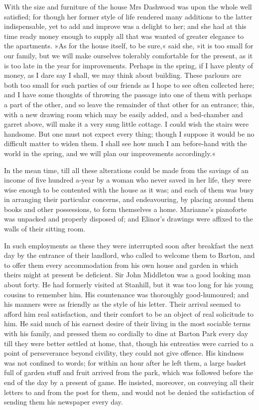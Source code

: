 With the size and furniture of the house Mrs Dashwood was upon the whole well satisfied; for though her former style of life rendered many additions to the latter indispensable, yet to add and improve was a delight to her; and she had at this time ready money enough to supply all that was wanted of greater elegance to the apartments. »As for the house itself, to be sure,« said she, »it is too small for our family, but we will make ourselves tolerably comfortable for the present, as it is too late in the year for improvements. Perhaps in the spring, if I have plenty of money, as I dare say I shall, we may think about building. These parlours are both too small for such parties of our friends as I hope to see often collected here; and I have some thoughts of throwing the passage into one of them with perhaps a part of the other, and so leave the remainder of that other for an entrance; this, with a new drawing room which may be easily added, and a bed-chamber and garret above, will make it a very snug little cottage. I could wish the stairs were handsome. But one must not expect every thing; though I suppose it would be no difficult matter to widen them. I shall see how much I am before-hand with the world in the spring, and we will plan our improvements accordingly.«

In the mean time, till all these alterations could be made from the savings of an income of five hundred a-year by a woman who never saved in her life, they were wise enough to be contented with the house as it was; and each of them was busy in arranging their particular concerns, and endeavouring, by placing around them books and other possessions, to form themselves a home. Marianne’s pianoforte was unpacked and properly disposed of; and Elinor’s drawings were affixed to the walls of their sitting room.

In such employments as these they were interrupted soon after breakfast the next day by the entrance of their landlord, who called to welcome them to Barton, and to offer them every accommodation from his own house and garden in which theirs might at present be deficient. Sir John Middleton was a good looking man about forty. He had formerly visited at Stanhill, but it was too long for his young cousins to remember him. His countenance was thoroughly good-humoured; and his manners were as friendly as the style of his letter. Their arrival seemed to afford him real satisfaction, and their comfort to be an object of real solicitude to him. He said much of his earnest desire of their living in the most sociable terms with his family, and pressed them so cordially to dine at Barton Park every day till they were better settled at home, that, though his entreaties were carried to a point of perseverance beyond civility, they could not give offence. His kindness was not confined to words; for within an hour after he left them, a large basket full of garden stuff and fruit arrived from the park, which was followed before the end of the day by a present of game. He insisted, moreover, on conveying all their letters to and from the post for them, and would not be denied the satisfaction of sending them his newspaper every day.

